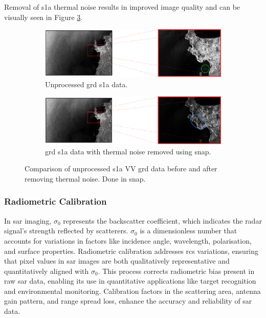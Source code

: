 Removal of \acs{s1a} thermal noise results in improved image quality and can be visually seen in Figure \ref{fig:theory.data.thermalNoiseRemoval}.

\begin{figure} [H]
    \centering
    \begin{subfigure}{0.95\textwidth}
        \includegraphics[width=\textwidth]{Figures/Theory/unprocessedSARData.pdf}
        \caption{Unprocessed \acs{grd} \acs{s1a} data.}
        \label{fig:theory.data.thermalNoise.unprocessed}
    \end{subfigure}   
    \begin{subfigure}{0.95\textwidth}
        \includegraphics[width=\textwidth]{Figures/Theory/thermalNoiseCalibratedSARData.pdf}
        \caption{\acs{grd} \acs{s1a} data with thermal noise removed using \acs{snap}.}
        \label{fig:theory.data.thermalNoise}
    \end{subfigure} 
    \caption{Comparison of unprocessed \acs{s1a} VV \acs{grd} data before and after removing thermal noise. Done in \acs{snap}.}
    \label{fig:theory.data.thermalNoiseRemoval}
\end{figure}

\subsubsection{Radiometric Calibration}

In \acs{sar} imaging, $\sigma_{0}$ represents the backscatter coefficient, which indicates the radar signal's strength reflected by scatterers. $\sigma_{0}$ is a dimensionless number that accounts for variations in factors like incidence angle, wavelength, polarisation, and surface properties. Radiometric calibration addresses \ac{rcs} variations, ensuring that pixel values in \acs{sar} images are both qualitatively representative and quantitatively aligned with $\sigma_{0}$. This process corrects radiometric bias present in raw \acs{sar} data, enabling its use in quantitative applications like target recognition and environmental monitoring. Calibration factors in the scattering area, antenna gain pattern, and range spread loss, enhance the accuracy and reliability of \acs{sar} data.

